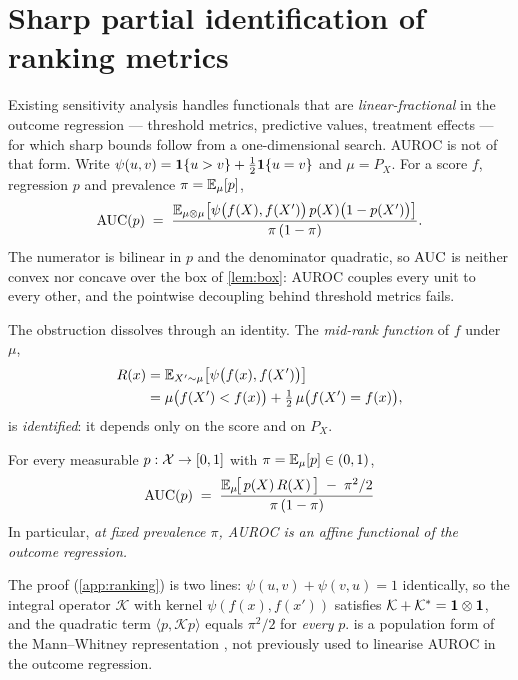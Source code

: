 \section{Sharp partial identification of ranking metrics}
\label{sec:ranking}

Existing sensitivity analysis handles functionals that are
\emph{linear-fractional} in the outcome regression --- threshold metrics,
predictive values, treatment effects \citep{zhao2019sensitivity,
dorn2023sharp} --- for which sharp bounds follow from a one-dimensional
search. AUROC is not of that form. Write
$\psi(u,v) = \mathbf{1}\{u>v\} + \tfrac12\mathbf{1}\{u=v\}$ and $\mu = P_X$. For a score
$f$, regression $p$ and prevalence $\pi = \mathbb{E}_\mu[p]$,
\begin{equation}
  \operatorname{AUC}(p)
  \;=\;
  \frac{\mathbb{E}_{\mu\otimes\mu}\big[\psi\big(f(X),f(X')\big)\,p(X)\big(1-p(X')\big)\big]}
       {\pi\,(1-\pi)} .
  \label{eq:auc-def}
\end{equation}
The numerator is bilinear in $p$ and the denominator quadratic, so $\operatorname{AUC}$ is
neither convex nor concave over the box of \cref{lem:box}: AUROC couples every
unit to every other, and the pointwise decoupling behind threshold metrics
fails.

The obstruction dissolves through an identity. The \emph{mid-rank function} of
$f$ under $\mu$,
\begin{equation}
  \begin{aligned}
  R(x) &= \mathbb{E}_{X'\sim\mu}\big[\psi\big(f(x), f(X')\big)\big] \\
       &= \mu\big(f(X') < f(x)\big) + \tfrac12\,\mu\big(f(X')=f(x)\big),
  \end{aligned}
  \label{eq:midrank}
\end{equation}
is \emph{identified}: it depends only on the score and on $P_X$.

\begin{theorem}
\label{thm:rank-identity}
For every measurable $p:\mathcal{X}\to[0,1]$ with $\pi=\mathbb{E}_\mu[p]\in(0,1)$,
\begin{equation}
  \operatorname{AUC}(p)
  \;=\;
  \frac{\mathbb{E}_\mu\!\big[\,p(X)\,R(X)\,\big] \;-\; \pi^{2}/2}{\pi\,(1-\pi)}
  \label{eq:rank-identity}
\end{equation}
In particular, \emph{at fixed prevalence $\pi$, AUROC is an affine functional of
the outcome regression.}
\end{theorem}

The proof (\cref{app:ranking}) is two lines: $\psi(u,v)+\psi(v,u)=1$
identically, so the integral operator $\mathcal{K}$ with kernel
$\psi(f(x),f(x'))$ satisfies $\mathcal{K}+\mathcal{K}^{*}=\mathbf{1}\otimes\mathbf{1}$,
and the quadratic term $\langle p,\mathcal{K}p\rangle$ equals $\pi^2/2$ for
\emph{every} $p$.
 is a population form of the Mann--Whitney
representation \citep{mann1947test}, not previously used to linearise AUROC
in the outcome regression.

